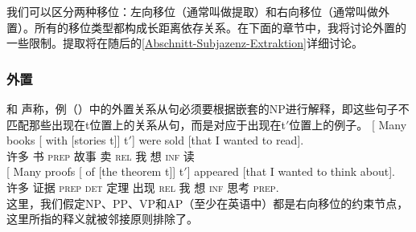 我们可以区分两种移位：左向移位（通常叫做提取）和右向移位（通常叫做外置）。所有的移位类型都构成长距离依存关系。在下面的章节中，我将讨论外置的一些限制。提取将在随后的\ref{Abschnitt-Subjazenz-Extraktion}详细讨论。

\subsubsection{外置}

\mbox{} \citet{Baltin81a}和 \citet[]{Chomsky86b}声称，例（）中的外置关系从句必须要根据嵌套的NP进行解释，即这些句子不匹配那些出现在t位置上的关系从句，而是对应于出现在t$'$位置上的例子。
\eal
\label{ex-chomsky-sub}
\ex 
\gll {}[ Many books [ with         [stories      t]] t$'$]  were         sold [that I wanted to read].\\
     {}          许多 书     {}       \textsc{prep} \spacebr{}故事 {}  {}     \passivepst{} 卖   \spacebr\textsc{rel} 我 想 \textsc{inf} 读\\
\ex
\gll {}[ Many proofs [ of            [the theorem t]] t$'$] appeared [that I wanted to think about].\\
     {}          许多  证据    {}       \textsc{prep} \spacebr\textsc{det} 定理 {} {} 出现 \spacebr\textsc{rel} 我 想 \textsc{inf} 思考 \textsc{prep}.\\
\zl
这里，我们假定NP、PP、VP和AP（至少在英语中）都是右向移位的约束节点，这里所指的释义就被邻接原则排除了\citep[]{Baltin81a}。

